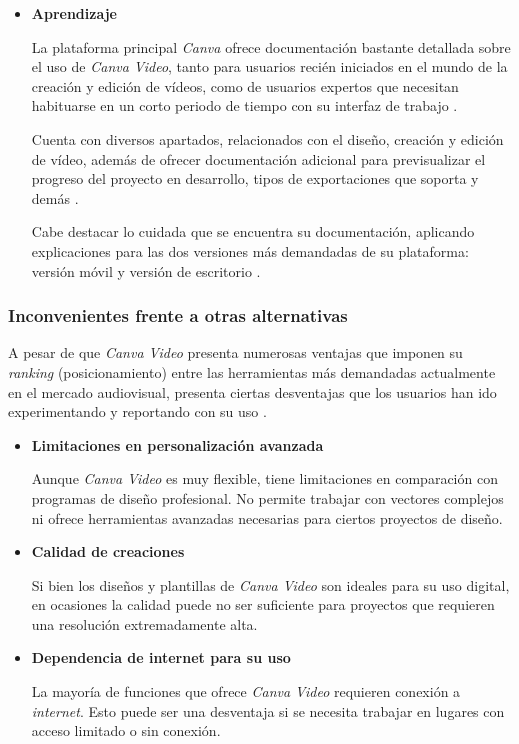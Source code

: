 \begin{itemize}
    \item \textbf{Aprendizaje}
    
    La plataforma principal \textit{Canva} ofrece documentación bastante detallada sobre el uso de 
    \textit{Canva Video}, tanto para usuarios recién iniciados en el mundo de la creación y edición de 
    vídeos, como de usuarios expertos que necesitan habituarse en un corto periodo de tiempo con su 
    interfaz de trabajo \cite{canva-aprendizaje}.

    Cuenta con diversos apartados, relacionados con el diseño, creación y edición de vídeo, además 
    de ofrecer documentación adicional para previsualizar el progreso del proyecto en desarrollo, 
    tipos de exportaciones que soporta y demás \cite{canva-aprendizaje-tutoriales} \cite{canva-ayuda-video}. 

    Cabe destacar lo cuidada que se encuentra su documentación, aplicando explicaciones para las 
    dos versiones más demandadas de su plataforma: versión móvil y versión de escritorio \cite{canva-help}.

\end{itemize}

\subsubsection{Inconvenientes frente a otras alternativas}
A pesar de que \textit{Canva Video} presenta numerosas ventajas que imponen su \textit{ranking} (posicionamiento) 
entre las herramientas más demandadas actualmente en el mercado audiovisual, presenta ciertas desventajas 
que los usuarios han ido experimentando y reportando con su uso \cite{canva-ventajas-desventajas}.

\begin{itemize}
    \item \textbf{Limitaciones en personalización avanzada}
    
    Aunque \textit{Canva Video} es muy flexible, tiene limitaciones en comparación con programas de 
    diseño profesional. No permite trabajar con vectores complejos ni ofrece herramientas avanzadas 
    necesarias para ciertos proyectos de diseño.

    \item \textbf{Calidad de creaciones}
    
    Si bien los diseños y plantillas de \textit{Canva Video} son ideales para su uso digital, en ocasiones 
    la calidad puede no ser suficiente para proyectos que requieren una resolución extremadamente alta.

    \item \textbf{Dependencia de internet para su uso}
    
    La mayoría de funciones que ofrece \textit{Canva Video} requieren conexión a \textit{internet}. 
    Esto puede ser una desventaja si se necesita trabajar en lugares con acceso limitado o sin conexión.
\end{itemize}

